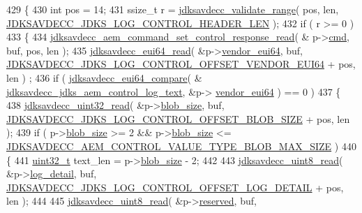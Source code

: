 \begin{DoxyCode}
429 \{
430     \textcolor{keywordtype}{int} pos = 14;
431     ssize\_t r = \hyperlink{group__util_ga9c02bdfe76c69163647c3196db7a73a1}{jdksavdecc\_validate\_range}( pos, len, 
      \hyperlink{group__jdks__log_gaade756dffaac6e4f6d3d3b16e4cea38b}{JDKSAVDECC\_JDKS\_LOG\_CONTROL\_HEADER\_LEN} );
432     \textcolor{keywordflow}{if} ( r >= 0 )
433     \{
434         \hyperlink{group__command__set__control__response_ga51e9c0e9f925de9340edeb0c66bb6b5a}{jdksavdecc\_aem\_command\_set\_control\_response\_read}( &
      p->\hyperlink{group__jdks_ga38de55b081b42c70b4caeb189e999cef}{cmd}, buf, pos, len );
435         \hyperlink{group__eui64_ga7c7ee5c2d293106f4d997affcbc3ef15}{jdksavdecc\_eui64\_read}( &p->\hyperlink{group__jdks_ga6183c85748a8af0003d293d653c4ae9b}{vendor\_eui64}, buf, 
      \hyperlink{group__jdks__log_gaa09f0dec1864081c2abbc426b9e387fd}{JDKSAVDECC\_JDKS\_LOG\_CONTROL\_OFFSET\_VENDOR\_EUI64} + pos, len )
      ;
436         \textcolor{keywordflow}{if} ( \hyperlink{group__eui64_ga1d7414dc665866d8ad0af100f8a52ef2}{jdksavdecc\_eui64\_compare}( &
      \hyperlink{group__jdks__log_ga492c3be3079a48fdf9366bdc514c0333}{jdksavdecc\_jdks\_aem\_control\_log\_text}, &p->
      \hyperlink{group__jdks_ga6183c85748a8af0003d293d653c4ae9b}{vendor\_eui64} ) == 0 )
437         \{
438             \hyperlink{group__endian_gaf75f53076978e7b51f12c19414e6070e}{jdksavdecc\_uint32\_read}( &p->\hyperlink{group__jdks_ga32143551b70893faef60f6e35f88ed50}{blob\_size}, buf, 
      \hyperlink{group__jdks__log_ga14027480ca9c47f6e02e3d96e3e9a1ad}{JDKSAVDECC\_JDKS\_LOG\_CONTROL\_OFFSET\_BLOB\_SIZE} + pos, len );
439             \textcolor{keywordflow}{if} ( p->\hyperlink{group__jdks_ga32143551b70893faef60f6e35f88ed50}{blob\_size} >= 2 && p->\hyperlink{group__jdks_ga32143551b70893faef60f6e35f88ed50}{blob\_size} <= 
      \hyperlink{group__aem__command_ga91176affe15020f1b22b04518eeb3d30}{JDKSAVDECC\_AEM\_CONTROL\_VALUE\_TYPE\_BLOB\_MAX\_SIZE} )
440             \{
441                 \hyperlink{parse_8c_a6eb1e68cc391dd753bc8ce896dbb8315}{uint32\_t} text\_len = p->\hyperlink{group__jdks_ga32143551b70893faef60f6e35f88ed50}{blob\_size} - 2;
442 
443                 \hyperlink{group__endian_ga25eac79531675b56aaa5d7870d880b33}{jdksavdecc\_uint8\_read}( &p->\hyperlink{group__jdks_ga61044f81305d515f41eea13f02f3cb81}{log\_detail}, buf, 
      \hyperlink{group__jdks__log_ga15244e4065b3ef420cd990e0d2e6bc0d}{JDKSAVDECC\_JDKS\_LOG\_CONTROL\_OFFSET\_LOG\_DETAIL} + pos, len );
444 
445                 \hyperlink{group__endian_ga25eac79531675b56aaa5d7870d880b33}{jdksavdecc\_uint8\_read}( &p->\hyperlink{group__jdks_gacb7bc06bed6f6408d719334fc41698c7}{reserved}, buf, 

\end{DoxyCode}
